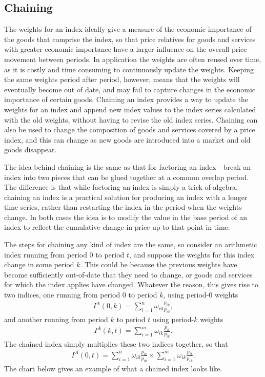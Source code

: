 \documentclass[]{article}
\begin{document}
\hypertarget{chaining}{%
\subsection{Chaining}\label{chaining}}

The weights for an index ideally give a measure of the economic importance of the goods that comprise the index, so that price relatives for goods and services with greater economic importance have a larger influence on the overall price movement between periods. In application the weights are often reused over time, as it is costly and time consuming to continuously update the weights. Keeping the same weights period after period, however, means that the weights will eventually become out of date, and may fail to capture changes in the economic importance of certain goods. Chaining an index provides a way to update the weights for an index and append new index values to the index series calculated with the old weights, without having to revise the old index series. Chaining can also be used to change the composition of goods and services covered by a price index, and this can change as new goods are introduced into a market and old goods disappear.

The idea behind chaining is the same as that for factoring an index---break an index into two pieces that can be glued together at a common overlap period. The difference is that while factoring an index is simply a trick of algebra, chaining an index is a practical solution for producing an index with a longer time series, rather than restarting the index in the period when the weights change. In both cases the idea is to modify the value in the base period of an index to reflect the cumulative change in price up to that point in time.

The steps for chaining any kind of index are the same, so consider an arithmetic index running from period 0 to period \(t\), and suppose the weights for this index change in some period \(k\). This could be because the previous weights have become sufficiently out-of-date that they need to change, or goods and services for which the index applies have changed. Whatever the reason, this gives rise to two indices, one running from period 0 to period \(k\), using period-0 weights
\begin{align*}
I^{A}(0, k) = \sum_{i = 1}^{n} \omega_{i0} \frac{p_{ik}}{p_{i0}},
\end{align*}
and another running from period \(k\) to period \(t\) using period-\(k\) weights
\begin{align*}
I^{A}(k, t) = \sum_{i = 1}^{m} \omega_{ik} \frac{p_{it}}{p_{ik}}.
\end{align*}
The chained index simply multiplies these two indices together, so that
\begin{align*}
I^{A}(0, t) = \sum_{i = 1}^{n} \omega_{i0} \frac{p_{ik}}{p_{i0}} \times \sum_{i = 1}^{m} \omega_{ik} \frac{p_{it}}{p_{ik}}.
\end{align*}
The chart below gives an example of what a chained index looks like.
\end{document}
